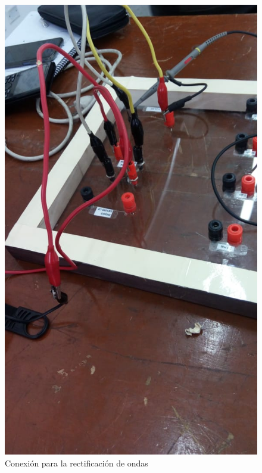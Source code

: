 \documentclass[a4paper,12pt]{report}
\begin{document}
\begin{figure}[H]
\begin{center}
\includegraphics[scale=0.42]{kesk3.jpeg}
\caption{Conexión para la rectificación de ondas}
\end{center}
\end{figure}
\end{document}
